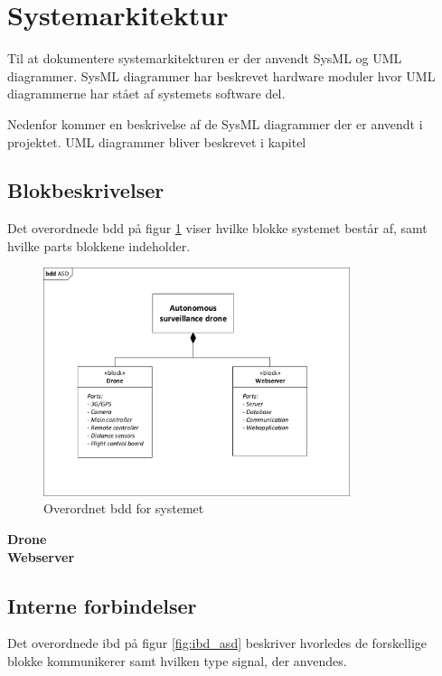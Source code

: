 \section{Systemarkitektur}
\label{chap:systemarkitektur}

Til at dokumentere systemarkitekturen er der anvendt SysML og UML diagrammer. SysML diagrammer har beskrevet hardware moduler hvor UML diagrammerne har stået af systemets software del.

Nedenfor kommer en beskrivelse af de SysML diagrammer der er anvendt i projektet. UML diagrammer bliver beskrevet i kapitel

\subsection{Blokbeskrivelser}
Det overordnede bdd på figur \ref{fig:bdd_asd} viser hvilke blokke systemet består af, samt hvilke parts blokkene indeholder.

\begin{figure}[H]
	\centering
	\includegraphics[width=0.80\textwidth]{Billeder/Projektbeskrivelse/bdd_overordnet.pdf}
	\caption{Overordnet bdd for systemet}
	\label{fig:bdd_asd}
\end{figure}

\textbf{Drone} \\


\textbf{Webserver} \\



\subsection{Interne forbindelser}

Det overordnede ibd på figur \ref{fig:ibd_asd} beskriver hvorledes de forskellige blokke kommunikerer samt hvilken type signal, der anvendes.

